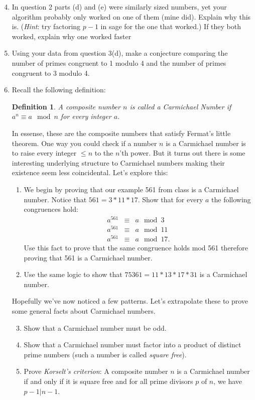 \documentclass[11pt]{article}
\newtheorem{definition}{Definition}
\begin{document}
\begin{enumerate}
  \setcounter{enumi}{3}
  \item{
  In question 2 parts (d) and (e) were similarly sized numbers, yet your algorithm probably only worked on one of them (mine did).  Explain why this is. (\textit{Hint}: try factoring $p-1$ in sage for the one that worked.)  If they both worked, explain why one worked faster
  }
  \item{
  Using your data from question 3(d), make a conjecture comparing the number of primes congruent to 1 modulo 4 and the number of primes congruent to 3 modulo 4.
  }
  \item{
  Recall the following definition:
  \begin{definition}
    A composite number $n$ is called a \textit{Carmichael Number} if $a^{n}\equiv a\mod n$ for every integer $a$.
  \end{definition}
  In essense, these are the composite numbers that satisfy Fermat's little theorem.   One way you could check if a number $n$ is a Carmichael number is to raise every integer $\le n$ to the $n$'th power.  But it turns out there is some interesting underlying structure to Carmichael numbers making their existence seem less coincidental.  Let's explore this:
  \begin{enumerate}
    \item{
    We begin by proving that our example 561 from class is a Carmichael number.  Notice that $561 = 3*11*17$.  Show that for every $a$ the following congruences hold:
    \begin{eqnarray*}
      a^{561}&\equiv& a\mod 3\\
      a^{561}&\equiv& a\mod 11\\
      a^{561}&\equiv& a\mod 17.
    \end{eqnarray*}
    Use this fact to prove that the same congruence holds mod 561 therefore proving that 561 is a Carmichael number.
    }
    \item{
    Use the same logic to show that $75361 = 11*13*17*31$ is a Carmichael number.
    }
  \end{enumerate}
  Hopefully we've now noticed a few patterns.  Let's extrapolate these to prove some general facts about Carmichael numbers.
  \begin{enumerate}
    \setcounter{enumii}{2}
    \item{
    Show that a Carmichael number must be odd.
    }
    \item{
    Show that a Carmichael number must factor into a product of distinct prime numbers (such a number is called \textit{square free}).
    }
    \item{
    Prove \textit{Korselt's criterion}: A composite number $n$ is a Carmichael number if and only if it is square free and for all prime divisors $p$ of $n$, we have $p-1|n-1$.
    }
  \end{enumerate}
  }
\end{enumerate}
\end{document}
